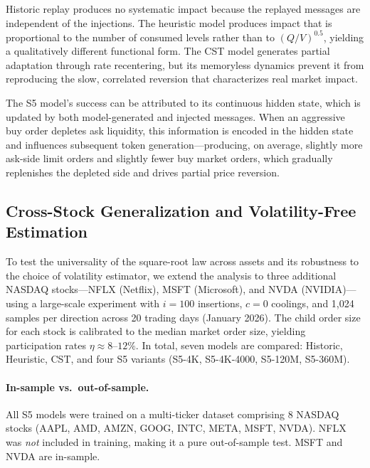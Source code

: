 \documentclass[sigplan,screen,anonymous]{acmart}
\begin{document}
Historic replay produces no systematic impact because the replayed messages are independent of the injections. The heuristic model produces impact that is proportional to the number of consumed levels rather than to $(Q/V)^{0.5}$, yielding a qualitatively different functional form. The CST model generates partial adaptation through rate recentering, but its memoryless dynamics prevent it from reproducing the slow, correlated reversion that characterizes real market impact.

The S5 model's success can be attributed to its continuous hidden state, which is updated by both model-generated and injected messages. When an aggressive buy order depletes ask liquidity, this information is encoded in the hidden state and influences subsequent token generation---producing, on average, slightly more ask-side limit orders and slightly fewer buy market orders, which gradually replenishes the depleted side and drives partial price reversion.


\subsection{Cross-Stock Generalization and Volatility-Free Estimation}
\label{sec:crossstock}

To test the universality of the square-root law across assets and its robustness to the choice of volatility estimator, we extend the analysis to three additional NASDAQ stocks---NFLX (Netflix), MSFT (Microsoft), and NVDA (NVIDIA)---using a large-scale experiment with $i=100$ insertions, $c=0$ coolings, and 1{,}024 samples per direction across 20 trading days (January 2026). The child order size for each stock is calibrated to the median market order size, yielding participation rates $\eta \approx 8$--$12\%$. In total, seven models are compared: Historic, Heuristic, CST, and four S5 variants (S5-4K, S5-4K-4000, S5-120M, S5-360M).

\paragraph{In-sample vs.\ out-of-sample.} All S5 models were trained on a multi-ticker dataset comprising 8 NASDAQ stocks (AAPL, AMD, AMZN, GOOG, INTC, META, MSFT, NVDA). NFLX was \emph{not} included in training, making it a pure out-of-sample test. MSFT and NVDA are in-sample.
\end{document}
